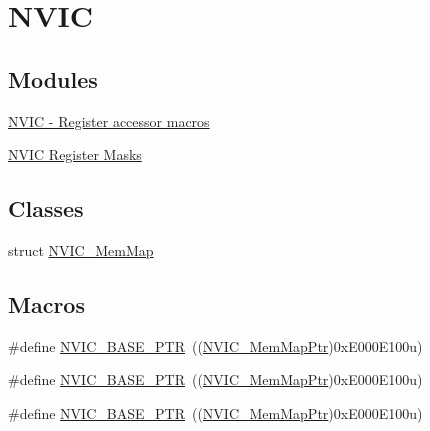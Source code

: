 \hypertarget{group___n_v_i_c___peripheral}{}\section{N\+V\+IC}
\label{group___n_v_i_c___peripheral}
\subsection*{Modules}
\begin{DoxyCompactItemize}
\item 
\hyperlink{group___n_v_i_c___register___accessor___macros}{N\+V\+I\+C -\/ Register accessor macros}
\item 
\hyperlink{group___n_v_i_c___register___masks}{N\+V\+I\+C Register Masks}
\end{DoxyCompactItemize}
\subsection*{Classes}
\begin{DoxyCompactItemize}
\item 
struct \hyperlink{struct_n_v_i_c___mem_map}{N\+V\+I\+C\+\_\+\+Mem\+Map}
\end{DoxyCompactItemize}
\subsection*{Macros}
\begin{DoxyCompactItemize}
\item 
\#define \hyperlink{group___n_v_i_c___peripheral_ga28f0a055d0c218e16d1fc7b13ff0caa5}{N\+V\+I\+C\+\_\+\+B\+A\+S\+E\+\_\+\+P\+TR}~((\hyperlink{group___n_v_i_c___peripheral_ga685d87c766bb24fb3330aa8cc48fa0e7}{N\+V\+I\+C\+\_\+\+Mem\+Map\+Ptr})0x\+E000\+E100u)
\item 
\#define \hyperlink{group___n_v_i_c___peripheral_ga28f0a055d0c218e16d1fc7b13ff0caa5}{N\+V\+I\+C\+\_\+\+B\+A\+S\+E\+\_\+\+P\+TR}~((\hyperlink{group___n_v_i_c___peripheral_ga685d87c766bb24fb3330aa8cc48fa0e7}{N\+V\+I\+C\+\_\+\+Mem\+Map\+Ptr})0x\+E000\+E100u)
\item 
\#define \hyperlink{group___n_v_i_c___peripheral_ga28f0a055d0c218e16d1fc7b13ff0caa5}{N\+V\+I\+C\+\_\+\+B\+A\+S\+E\+\_\+\+P\+TR}~((\hyperlink{group___n_v_i_c___peripheral_ga685d87c766bb24fb3330aa8cc48fa0e7}{N\+V\+I\+C\+\_\+\+Mem\+Map\+Ptr})0x\+E000\+E100u)
\end{DoxyCompactItemize}
